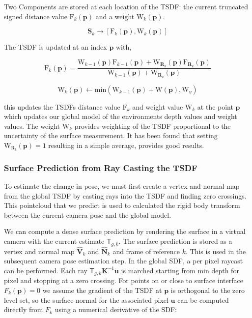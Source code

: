 \documentclass[10pt, twocolumn]{article}
\begin{document}
Two Components are stored at each location of the TSDF: the current truncated signed distance value $\mathrm{F}_{k}(\mathbf{p})$ and a weight $\mathrm{W}_k(\mathbf{p})$.

\begin{equation}
\mathbf{S}_{k} \rightarrow [\mathrm{F}_{k}(\mathbf{p}), \mathrm{W}_{k}(\mathbf{p})]
\end{equation}

The TSDF is updated at an index $\mathbf{p}$ with,

\begin{equation}
\mathrm{F}_k(\mathbf{p}) = \frac{\mathrm{W}_{k-1}(\mathbf{p}) \mathrm{F}_{k-1}(\mathbf{p}) + \mathrm{W}_{\mathbf{R}_k}(\mathbf{p}) \mathrm{F}_{\mathbf{R}_k}(\mathbf{p})}{\mathrm{W}_{k-1}(\mathbf{p}) + \mathrm{W}_{\mathbf{R}_k}(\mathbf{p})}
\end{equation}

\begin{equation}
\mathrm{W}_k (\mathbf{p}) \leftarrow \mathrm{min} (\mathrm{W}_{k-1} (\mathbf{p}) + \mathrm{W} (\mathbf{p}), \mathrm{W}_{\eta})
\end{equation}

this updates the TSDFs distance value $\mathrm{F}_k$ and weight value $\mathrm{W}_k$ at the point $\mathbf{p}$ which updates our global model of the environments depth values and weight values. The weight $\mathrm{W}_k$ provides weighting of the TSDF proportional to the uncertainty of the surface measurement. It has been found that setting $\mathrm{W}_{\mathrm{R}_k} (\mathbf{p}) = 1$ resulting in a simple average, provides good results. 

\subsubsection{Surface Prediction from Ray Casting the TSDF} \label{sec:surface}
To estimate the change in pose, we must first create a vertex and normal map from the global TSDF by casting rays into the TSDF and finding zero crossings. This pointcloud that we predict is used to calculated the rigid body transform between the current camera pose and the global model.

We can compute a dense surface prediction by rendering the surface in a virtual camera with the current estimate $\mathsf{T}_{g,k}$. 
The surface prediction is stored as a vertex and normal map $\hat{\mathbf{V}}_{k}$ and $\hat{\mathbf{N}}_{k}$ and frame of reference $k$.
This is used in the subsequent camera pose estimation step.
In the global SDF, a per pixel raycast can be performed. Each ray $\mathsf{T}_{g,k}\mathbf{K}^{-1}\mathbf{\dot{u}}$ is marched starting from min depth for pixel and stopping at a zero crossing.
For points on or close to surface interface $F_{k}(\mathbf{p}) = 0$ we assume the gradient of the TSDF at $\mathbf{p}$ is orthogonal to the zero level set, so the surface normal for the associated pixel $\mathbf{u}$ can be computed directly from $F_{k}$ using a numerical derivative of the SDF:
\end{document}
